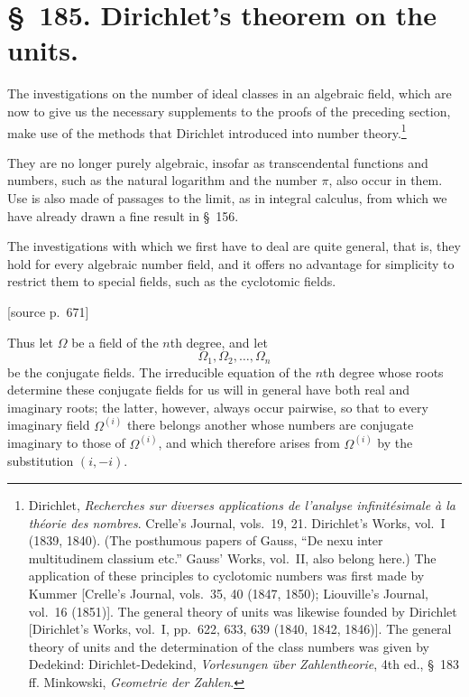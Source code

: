 \documentclass[11pt]{article}
\newcommand{\srcpage}[1]{\par\medskip\noindent\textsf{[source p.~#1]}\par\smallskip}
\begin{document}
\section*{\S~185. Dirichlet's theorem on the units.}

The investigations on the number of ideal classes in an algebraic field, which are now to give us the necessary supplements to the proofs of the preceding section, make use of the methods that Dirichlet introduced into number theory.\footnote{Dirichlet, \textit{Recherches sur diverses applications de l'analyse infinitésimale à la théorie des nombres}. Crelle's Journal, vols.~19, 21. Dirichlet's Works, vol.~I (1839, 1840). (The posthumous papers of Gauss, ``De nexu inter multitudinem classium etc.'' Gauss' Works, vol.~II, also belong here.) The application of these principles to cyclotomic numbers was first made by Kummer [Crelle's Journal, vols.~35, 40 (1847, 1850); Liouville's Journal, vol.~16 (1851)]. The general theory of units was likewise founded by Dirichlet [Dirichlet's Works, vol.~I, pp.~622, 633, 639 (1840, 1842, 1846)]. The general theory of units and the determination of the class numbers was given by Dedekind: Dirichlet-Dedekind, \textit{Vorlesungen über Zahlentheorie}, 4th ed., \S~183 ff. Minkowski, \textit{Geometrie der Zahlen}.}

They are no longer purely algebraic, insofar as transcendental functions and numbers, such as the natural logarithm and the number $\pi$, also occur in them. Use is also made of passages to the limit, as in integral calculus, from which we have already drawn a fine result in \S~156.

The investigations with which we first have to deal are quite general, that is, they hold for every algebraic number field, and it offers no advantage for simplicity to restrict them to special fields, such as the cyclotomic fields.

\srcpage{671}
Thus let $\Omega$ be a field of the $n$th degree, and let
\begin{equation}
\Omega_1,\Omega_2,\ldots,\Omega_n
\tag{1}
\end{equation}
be the conjugate fields. The irreducible equation of the $n$th degree whose roots determine these conjugate fields for us will in general have both real and imaginary roots; the latter, however, always occur pairwise, so that to every imaginary field $\Omega^{(i)}$ there belongs another whose numbers are conjugate imaginary to those of $\Omega^{(i)}$, and which therefore arises from $\Omega^{(i)}$ by the substitution $(i,-i)$.
\end{document}
